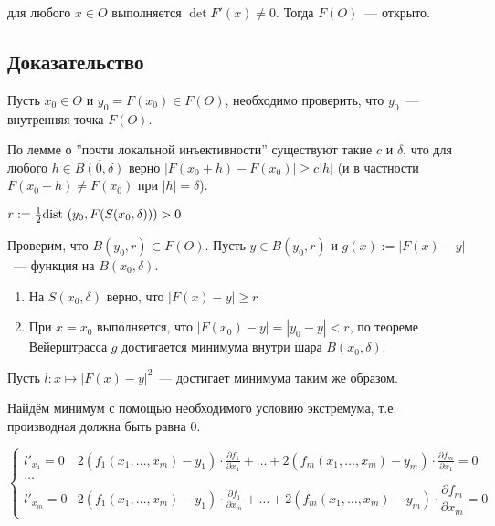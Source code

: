 \documentclass{article}
\begin{document}
        для любого $x \in O$ выполняется $\det F'(x) \neq 0$. Тогда $F(O)$~--- открыто.
        
        \subsection{Доказательство}
        
            Пусть $x_0 \in O$ и $y_0 = F(x_0) \in F(O)$, необходимо проверить, что $y_0$~--- внутренняя точка $F(O)$.
            
            По лемме о ''почти локальной инъективности'' существуют такие $c$ и $\delta$, что для любого $h \in \overline{B(0, \delta)}$ верно $\left| F(x_0 + h) - F(x_0) \right| \geq c | h |$ (и в частности $F(x_0 + h) \neq F(x_0)$ при $| h | = \delta$).
            
            $r := \frac{1}{2} \dist \left( y_0, F(S(x_0, \delta)) \right) > 0$
            
            Проверим, что $B(y_0, r) \subset F(O)$. Пусть $y \in B(y_0, r)$ и $g(x) := \left| F(x) - y \right|$~--- функция на $\overline{B(x_0, \delta)}$.
            
            \begin{enumerate}
            
                \item На $S(x_0, \delta)$ верно, что $\left| F(x) - y \right| \geq r$
                
                \item При $x = x_0$ выполняется, что $\left| F(x_0) - y \right| = | y_0 - y | < r$, по теореме Вейерштрасса $g$ достигается минимума внутри шара $B(x_0, \delta)$.
                
            \end{enumerate}
            
            Пусть $l : x \mapsto \left| F(x) - y \right|^2$~--- достигает минимума таким же образом.
            
            Найдём минимум с помощью необходимого условию экстремума, т.е. производная должна быть равна $0$.
            
            \begin{equation*}
                \begin{cases}
   
                    l'_{x_1} = 0 & 2 (f_1 (x_1, \ldots, x_m) - y_1) \cdot \frac{\partial f_1}{\partial x_1} + \ldots + 2 (f_m (x_1, \ldots, x_m) - y_m) \cdot \frac{\partial f_m}{\partial x_1} = 0 \\
                    
                    \ldots \\
                    
                    l'_{x_m} = 0 & 2 (f_1 (x_1, \ldots, x_m) - y_1) \cdot \frac{\partial f_1}{\partial x_m} + \ldots + 2 (f_m (x_1, \ldots, x_m) - y_m) \cdot \dfrac{\partial f_m}{\partial x_m} = 0
                
                \end{cases}
            \end{equation*}
            
\end{document}

